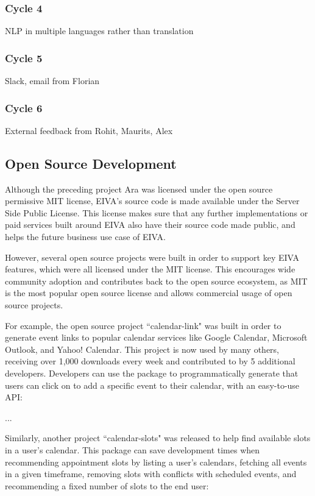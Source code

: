 \documentclass{article}
\begin{document}
\subsubsection{Cycle 4}

NLP in multiple languages rather than translation \thesubsubsection

\subsubsection{Cycle 5}

Slack, email from Florian

\subsubsection{Cycle 6}

External feedback from Rohit, Maurits, Alex

\subsection{Open Source Development}

Although the preceding project Ara was licensed under the open source permissive MIT license, EIVA's source code is made available under the Server Side Public License. This license makes sure that any further implementations or paid services built around EIVA also have their source code made public, and helps the future business use case of EIVA.

However, several open source projects were built in order to support key EIVA features, which were all licensed under the MIT license. This encourages wide community adoption and contributes back to the open source ecosystem, as MIT is the most popular open source license and allows commercial usage of open source projects.

For example, the open source project ``calendar-link" was built in order to generate event links to popular calendar services like Google Calendar, Microsoft Outlook, and Yahoo! Calendar. This project is now used by many others, receiving over 1,000 downloads every week and contributed to by 5 additional developers. Developers can use the package to programmatically generate that users can click on to add a specific event to their calendar, with an easy-to-use API:

...

Similarly, another project ``calendar-slots" was released to help find available slots in a user's calendar. This package can save development times when recommending appointment slots by listing a user's calendars, fetching all events in a given timeframe, removing slots with conflicts with scheduled events, and recommending a fixed number of slots to the end user:
\end{document}
